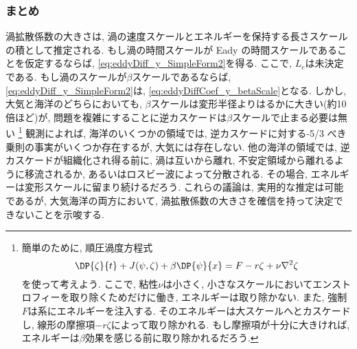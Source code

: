 \subsubsection*{まとめ}
渦拡散係数の大きさは, 渦の速度スケールとエネルギーを保持する長さスケールの積として推定される.
もし渦の時間スケールが Eady の時間スケールであることを仮定するならば, \eqref{eq:eddyDiff_y_SimpleForm2}を得る.
ここで, $L_e$は未決定である.
もし渦のスケールが$\beta$スケールであるならば, \eqref{eq:eddyDiff_y_SimpleForm2}は,
\eqref{eq:eddyDiffCoef_y_betaScale}となる.
しかし, 大気と海洋のどちらにおいても, $\beta$スケールは変形半径よりはるかに大きい(約10倍ほど)が,
問題を複雑にすることに逆カスケードは$\beta$スケールで止まる必要は無い%
\footnote{
簡単のために, 順圧渦度方程式
$$
\DP{\zeta}{t} + J(\psi, \zeta) + \beta \DP{\psi}{x} = F - r \zeta + \nu \nabla^2 \zeta
$$
を使って考えよう.
ここで, 粘性$\nu$は小さく, 小さなスケールにおいてエンストロフィーを取り除くためだけに働き,
エネルギーは取り除かない.
また, 強制$F$は系にエネルギーを注入する.
そのエネルギーは大スケールへとカスケードし, 線形の摩擦項$-r\zeta$によって取り除かれる.
もし摩擦項が十分に大きければ, エネルギーは$\beta$効果を感じる前に取り除かれるだろう. 
}
観測によれば, 海洋のいくつかの領域では, 逆カスケードに対する-5/3 べき乗則の事実がいくつか存在するが,
大気には存在しない.
他の海洋の領域では, 逆カスケードが組織化され得る前に, 渦は互いから離れ, 不安定領域から離れるように移流されるか, 
あるいはロスビー波によって分散される.
その場合, エネルギーは変形スケールに留まり続けるだろう.
これらの議論は, 実用的な推定は可能であるが,
大気海洋の両方において, 渦拡散係数の大きさを確信を持って決定できないことを示唆する. 


